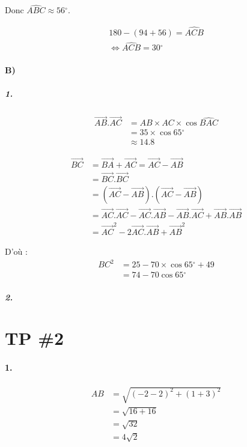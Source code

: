 \documentclass[12pt]{article}
\newcommand{\degree}{\ensuremath{^\circ}}
\begin{document}
Donc $\widehat{ABC} \approx 56\degree$.

\begin{align*}
180 - (94 + 56) = \widehat{ACB}\\
\Leftrightarrow \widehat{ACB} = 30\degree
\end{align*}

\paragraph{B)}
\subparagraph{1.}
\begin{align*}
\overrightarrow{AB}.\overrightarrow{AC} &= AB \times AC \times \cos \widehat{BAC}\\
&= 35 \times \cos 65\degree\\
&\approx 14.8
\end{align*}

\begin{align*}
\overrightarrow{BC} &= \overrightarrow{BA} + \overrightarrow{AC} = \overrightarrow{AC} - \overrightarrow{AB}\\
&= \overrightarrow{BC}.\overrightarrow{BC}\\
&= (\overrightarrow{AC} - \overrightarrow{AB}).(\overrightarrow{AC} - \overrightarrow{AB})\\
&= \overrightarrow{AC}.\overrightarrow{AC} - \overrightarrow{AC}.\overrightarrow{AB} - \overrightarrow{AB}.\overrightarrow{AC} + \overrightarrow{AB}.\overrightarrow{AB}\\
&= \overrightarrow{AC}^2 - 2\overrightarrow{AC}.\overrightarrow{AB} + \overrightarrow{AB}^2
\end{align*}

D'où :
\begin{align*}
BC^2 &= 25 - 70 \times \cos 65\degree + 49\\
&= 74 - 70 \cos 65\degree
\end{align*}

\subparagraph{2.}

\section*{TP \#2}

\paragraph{1.}
\begin{align*}
AB &= \sqrt{(-2 - 2)^2 + (1 + 3)^2}\\
&= \sqrt{16 + 16}\\
&= \sqrt{32}\\
&= 4\sqrt{2}
\end{align*}
\end{document}
